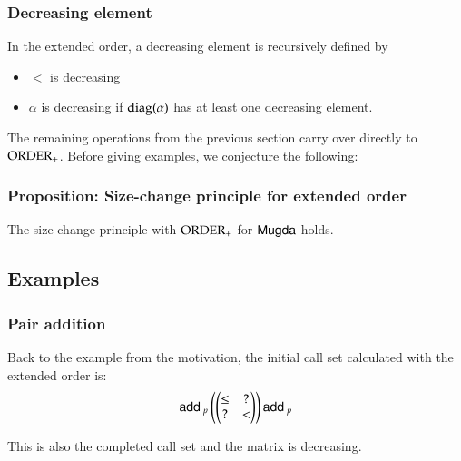 \subsubsection{Decreasing element}
In the extended order, a decreasing element is recursively defined by
\begin{itemize}
\item
$<$ is decreasing
\item
$\alpha$ is decreasing if $\operatorname{diag}(\alpha)$ has at least one decreasing element.
\end{itemize}

The remaining operations from the previous section carry over directly to $\operatorname{ORDER_{+}}$.
\noindent Before giving examples, we conjecture the following:
\subsubsection{Proposition: Size-change principle for extended order}
The size change principle with $\operatorname{ORDER_{+}}$ for $\textsf{Mugda}$ holds.

\subsection{Examples}

\subsubsection{Pair addition}
Back to the example from the motivation, the initial call set calculated with the extended order is:
\[
\mathsf{add}\:_p\begin{pmatrix}
\begin{pmatrix}
\leq & ? \\
?    & < \\
\end{pmatrix}
\end{pmatrix}\mathsf{add}\:_p
\]

\noindent This is also the completed call set and the matrix is decreasing.

